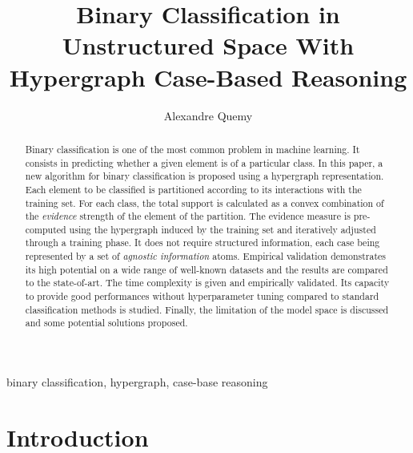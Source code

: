 \documentclass[preprint,12pt]{elsarticle}
\theoremstyle{definition}
\begin{document}
\begin{frontmatter}

\title{Binary Classification in Unstructured Space With Hypergraph Case-Based Reasoning}

\author{Alexandre Quemy}
\address{IBM Krakow Software Lab, Cracow, Poland}
\address{Faculty of Computing, Pozna\'n University of Technology, Pozna\'n, Poland}


\begin{abstract}
Binary classification is one of the most common problem in machine learning. It consists in predicting whether a given element is of a particular class. In this paper, a new algorithm for binary classification is proposed using a hypergraph representation. Each element to be classified is partitioned according to its interactions with the training set. For each class, the total support is calculated as a convex combination of the {\it evidence} strength of the element of the partition. The evidence measure is pre-computed using the hypergraph induced by the training set and iteratively adjusted through a training phase. It does not require structured information, each case being represented by a set of {\it agnostic information} atoms. Empirical validation demonstrates its high potential on a wide range of well-known datasets and the results are compared to the state-of-art. The time complexity is given and empirically validated. Its capacity to provide good performances without hyperparameter tuning compared to standard classification methods is studied. Finally, the limitation of the model space is discussed and some potential solutions proposed.
\end{abstract}


\begin{keyword}
binary classification, hypergraph, case-base reasoning
\end{keyword}

\end{frontmatter}

\linenumbers


\section{Introduction}\label{sec:intro}
\end{document}

